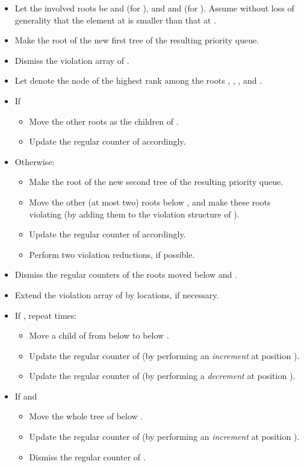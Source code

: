 \documentclass{llncs}
\begin{document}
\begin{itemize}
\item Let the involved roots be  and  (for ), and 
  and  (for ). Assume without loss of generality that
  the element at  is smaller than that at .
\item Make  the root of the new first tree of the resulting priority queue.
\item Dismiss the violation array of .
\item Let  denote the node of the highest rank among the roots
  , , , and .
\item If 
 \begin{itemize}
  \item Move the other roots as the children of . 
  \item Update the regular counter of  accordingly.
 \end{itemize}
\item Otherwise:
 \begin{itemize}
  \item Make  the root of the new second tree of the resulting priority queue.
  \item Move the other (at most two) roots below , and make these roots violating 
  (by adding them to the violation structure of ).
  \item Update the regular counter of  accordingly.
  \item Perform two violation reductions, if possible.
 \end{itemize}
\item Dismiss the regular counters of the roots moved below  and .
\item Extend the violation array of  by  locations, if necessary.
\item If , repeat  times: 
   \begin{itemize}
    \item Move a child of  from below  to below .
    \item  Update the regular counter of  (by performing an {\it increment} at position ).
    \item  Update the regular counter of  (by performing a {\it decrement} at position ).
   \end{itemize}
\item If  and 
	\begin{itemize} 
		\item  Move the whole tree of  below .
	  \item  Update the regular counter of  (by performing an {\it increment} at position ).
	  \item  Dismiss the regular counter of .
  \end{itemize}
\end{itemize}
\end{document}
